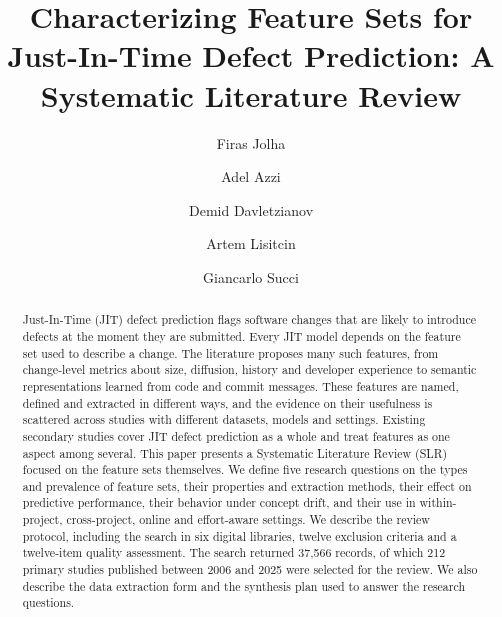\documentclass[sigconf,review]{acmart}
\begin{document}
\title[Feature Sets for JIT Defect Prediction: An SLR]{Characterizing Feature Sets for Just-In-Time Defect Prediction: A Systematic Literature Review}

\author{Firas Jolha}

\author{Adel Azzi}

\author{Demid Davletzianov}

\author{Artem Lisitcin}

\author{Giancarlo Succi}

\renewcommand{\shortauthors}{Jolha et al.}

\begin{abstract}
Just-In-Time (JIT) defect prediction flags software changes that are likely to introduce defects at the moment they are submitted. Every JIT model depends on the feature set used to describe a change. The literature proposes many such features, from change-level metrics about size, diffusion, history and developer experience to semantic representations learned from code and commit messages. These features are named, defined and extracted in different ways, and the evidence on their usefulness is scattered across studies with different datasets, models and settings. Existing secondary studies cover JIT defect prediction as a whole and treat features as one aspect among several. This paper presents a Systematic Literature Review (SLR) focused on the feature sets themselves. We define five research questions on the types and prevalence of feature sets, their properties and extraction methods, their effect on predictive performance, their behavior under concept drift, and their use in within-project, cross-project, online and effort-aware settings. We describe the review protocol, including the search in six digital libraries, twelve exclusion criteria and a twelve-item quality assessment. The search returned 37,566 records, of which 212 primary studies published between 2006 and 2025 were selected for the review. We also describe the data extraction form and the synthesis plan used to answer the research questions.
\end{abstract}
\end{document}
